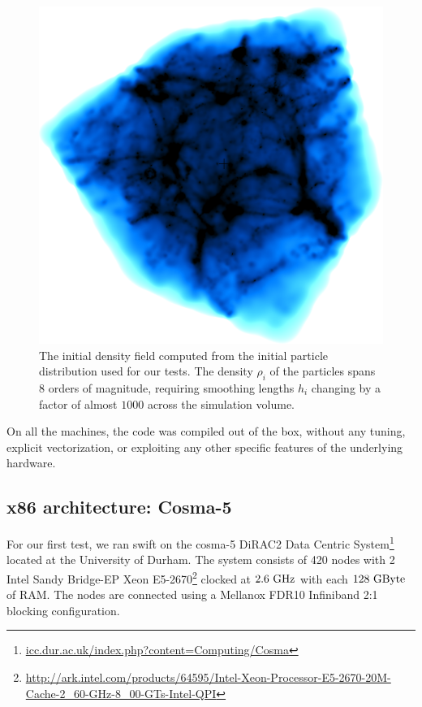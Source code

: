 \documentclass{sig-alternate-05-2015}
\newcommand{\swift}{{\sc swift}\xspace}
\begin{document}
\begin{figure}
\centering
\includegraphics[width=\columnwidth]{Figures/cosmoVolume}
\caption{The initial density field computed from the initial particle
  distribution used for our tests. The density $\rho_i$ of the particles spans 8
  orders of magnitude, requiring smoothing lengths $h_i$ changing by a factor of
  almost $1000$ across the simulation volume. \label{fig:ICs}}
\end{figure}  

On all the machines, the code was compiled out of the box,
without any tuning, explicit vectorization, or exploiting any
other specific features of the underlying hardware. 

\subsection{x86 architecture: Cosma-5}

For our first test, we ran \swift on the cosma-5 DiRAC2 Data Centric
System\footnote{\url{icc.dur.ac.uk/index.php?content=Computing/Cosma}} located
at the University of Durham. The system consists of 420 nodes with 2 Intel Sandy
Bridge-EP Xeon
E5-2670\footnote{\url{http://ark.intel.com/products/64595/Intel-Xeon-Processor-E5-2670-20M-Cache-2_60-GHz-8_00-GTs-Intel-QPI}}
clocked at $2.6~\rm{GHz}$ with each $128~\rm{GByte}$ of RAM. The nodes are
connected using a Mellanox FDR10 Infiniband 2:1 blocking configuration.
\end{document}

